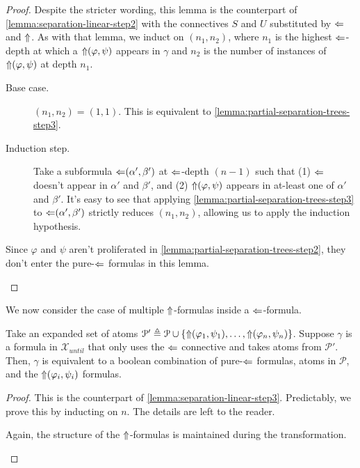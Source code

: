 \documentclass[a4paper,UKenglish,cleveref, autoref, thm-restate, numberwithinsect]{lipics-v2021}
\def\Larrow{\ensuremath\mathord{\Leftarrow}}
\def\Uarrow{\ensuremath\mathord{\Uparrow}}
\begin{document}
\begin{proof}
    Despite the stricter wording, this lemma is the counterpart of \cref{lemma:separation-linear-step2} with the connectives $S$ and $U$ substituted by $\Larrow$ and $\Uarrow$. As with that lemma, we induct on $(n_1, n_2)$, where $n_1$ is the highest $\Larrow$-depth at which a $\Uarrow(\varphi, \psi)$ appears in $\gamma$ and $n_2$ is the number of instances of $\Uarrow(\varphi, \psi)$ at depth $n_1$.
    \begin{description}
        \item[Base case.] $(n_1, n_2) = (1, 1)$. This is equivalent to \cref{lemma:partial-separation-trees-step3}.
        \item[Induction step.] Take a subformula $\Larrow(\alpha', \beta')$ at $\Larrow$-depth $(n-1)$ such that (1) $\Larrow$ doesn't appear in $\alpha'$ and $\beta'$, and (2) $\Uarrow(\varphi, \psi)$ appears in at-least one of $\alpha'$ and $\beta'$. It's easy to see that applying \cref{lemma:partial-separation-trees-step3} to $\Larrow(\alpha', \beta')$ strictly reduces $(n_1, n_2)$, allowing us to apply the induction hypothesis.
    \end{description}
    \begin{remark*}
        Since $\varphi$ and $\psi$ aren't proliferated in \cref{lemma:partial-separation-trees-step2}, they don't enter the pure-$\Larrow$ formulas in this lemma.
    \end{remark*}
\end{proof}
We now consider the case of multiple $\Uarrow$-formulas inside a $\Larrow$-formula.
\begin{lemma}
    \label{lemma:partial-separation-trees-step5}
    Take an expanded set of atoms $\mathcal{P}' \triangleq \mathcal{P} \cup \{\Uarrow(\varphi_1, \psi_1), \ldots, \Uarrow(\varphi_n, \psi_n)\}$. Suppose $\gamma$ is a formula in $\mathcal{X}_{until}$ that only uses the $\Larrow$ connective and takes atoms from $\mathcal{P}'$. Then, $\gamma$ is equivalent to a boolean combination of pure-$\Larrow$ formulas, atoms in $\mathcal{P}$, and the $\Uarrow(\varphi_i, \psi_i)$ formulas.
\end{lemma}
\begin{proof}
    This is the counterpart of \cref{lemma:separation-linear-step3}. Predictably, we prove this by inducting on $n$. The details are left to the reader. %
    \begin{remark*}
        Again, the structure of the $\Uarrow$-formulas is maintained during the transformation.
    \end{remark*}
\end{proof}
\end{document}
